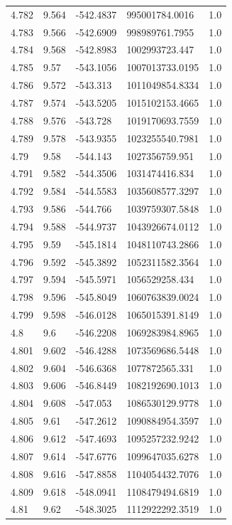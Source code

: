 \begin{tabular}{lllll}
4.782 & 9.564 & -542.4837 & 995001784.0016 & 1.0 \\
4.783 & 9.566 & -542.6909 & 998989761.7955 & 1.0 \\
4.784 & 9.568 & -542.8983 & 1002993723.447 & 1.0 \\
4.785 & 9.57 & -543.1056 & 1007013733.0195 & 1.0 \\
4.786 & 9.572 & -543.313 & 1011049854.8334 & 1.0 \\
4.787 & 9.574 & -543.5205 & 1015102153.4665 & 1.0 \\
4.788 & 9.576 & -543.728 & 1019170693.7559 & 1.0 \\
4.789 & 9.578 & -543.9355 & 1023255540.7981 & 1.0 \\
4.79 & 9.58 & -544.143 & 1027356759.951 & 1.0 \\
4.791 & 9.582 & -544.3506 & 1031474416.834 & 1.0 \\
4.792 & 9.584 & -544.5583 & 1035608577.3297 & 1.0 \\
4.793 & 9.586 & -544.766 & 1039759307.5848 & 1.0 \\
4.794 & 9.588 & -544.9737 & 1043926674.0112 & 1.0 \\
4.795 & 9.59 & -545.1814 & 1048110743.2866 & 1.0 \\
4.796 & 9.592 & -545.3892 & 1052311582.3564 & 1.0 \\
4.797 & 9.594 & -545.5971 & 1056529258.434 & 1.0 \\
4.798 & 9.596 & -545.8049 & 1060763839.0024 & 1.0 \\
4.799 & 9.598 & -546.0128 & 1065015391.8149 & 1.0 \\
4.8 & 9.6 & -546.2208 & 1069283984.8965 & 1.0 \\
4.801 & 9.602 & -546.4288 & 1073569686.5448 & 1.0 \\
4.802 & 9.604 & -546.6368 & 1077872565.331 & 1.0 \\
4.803 & 9.606 & -546.8449 & 1082192690.1013 & 1.0 \\
4.804 & 9.608 & -547.053 & 1086530129.9778 & 1.0 \\
4.805 & 9.61 & -547.2612 & 1090884954.3597 & 1.0 \\
4.806 & 9.612 & -547.4693 & 1095257232.9242 & 1.0 \\
4.807 & 9.614 & -547.6776 & 1099647035.6278 & 1.0 \\
4.808 & 9.616 & -547.8858 & 1104054432.7076 & 1.0 \\
4.809 & 9.618 & -548.0941 & 1108479494.6819 & 1.0 \\
4.81 & 9.62 & -548.3025 & 1112922292.3519 & 1.0 \\

\end{tabular}

